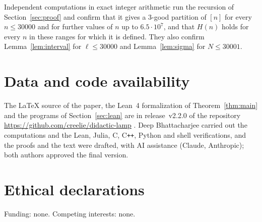 \documentclass[preprint,12pt]{elsarticle}
\theoremstyle{definition}
\begin{document}
Independent computations in exact integer arithmetic run the recursion of Section~\ref{sec:proof} and confirm that it gives a $3$-good partition of $[n]$ for every $n\le30000$ and for further values of $n$ up to $6.5\cdot10^7$, and that $H(n)$ holds for every $n$ in these ranges for which it is defined. They also confirm Lemma~\ref{lem:interval} for $\ell\le30000$ and Lemma~\ref{lem:sigma} for $N\le30001$.

\section*{Data and code availability}
\begingroup\raggedright
The \LaTeX{} source of the paper, the Lean~4 formalization of Theorem~\ref{thm:main} and the programs of Section~\ref{sec:lean} are in release~v2.2.0 of the repository \url{https://github.com/creelie/didactic-lamp} \cite{archive}. Deep Bhattacharjee carried out the computations and the Lean, Julia, C, C\texttt{++}, Python and shell verifications, and the proofs and the text were drafted, with AI assistance (Claude, Anthropic); both authors approved the final version.\par
\endgroup

\section*{Ethical declarations}
Funding: none. Competing interests: none.
\end{document}
